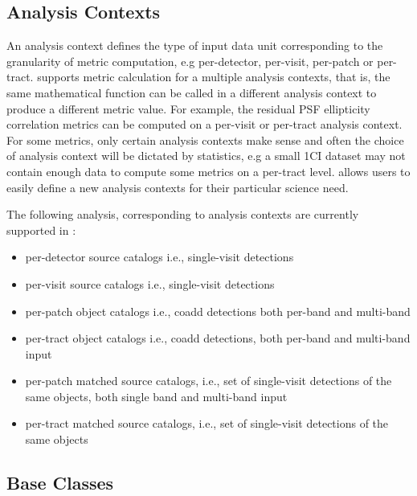 \subsection{Analysis Contexts} \label{ssec:contexts}

An analysis context defines the type of input data unit corresponding to the granularity of metric computation, e.g per-detector, per-visit, per-patch or per-tract.
\faro supports metric calculation for a multiple analysis contexts, that is, the same mathematical function can be called in a different analysis context to produce a different metric value. 
For example, the residual PSF ellipticity correlation metrics can be computed on a per-visit or per-tract analysis context. 
For some metrics, only certain analysis contexts make sense and often the choice of analysis context will be dictated by statistics, e.g a small 1\degsq CI dataset may not contain enough data to compute some metrics on a per-tract level. 
\faro allows users to easily define a new analysis contexts for their particular science need. 

The following analysis, corresponding to analysis contexts  are currently supported in \faro:
\begin{itemize}
\item per-detector source catalogs i.e., single-visit detections
\item per-visit source catalogs i.e., single-visit detections
\item per-patch object catalogs i.e., coadd detections both per-band and multi-band
\item per-tract object catalogs i.e., coadd detections, both per-band and multi-band input
\item per-patch matched source catalogs, i.e., set of single-visit detections of the same objects, both single band and multi-band input
\item per-tract matched source catalogs, i.e., set of single-visit detections of the same objects 
\end{itemize}

\subsection{Base Classes} \label{ssec:baseclasses}

